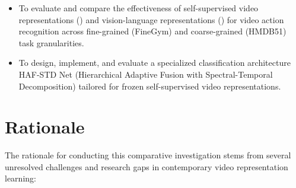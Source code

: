 \begin{itemize}
    \item To evaluate and compare the effectiveness of self-supervised video representations (\vjepaa{}) and vision-language representations (\qwenvl{}) for video action recognition across fine-grained (FineGym) and coarse-grained (HMDB51) task granularities.
    \item To design, implement, and evaluate a specialized classification architecture HAF-STD Net (Hierarchical Adaptive Fusion with Spectral-Temporal Decomposition) tailored for frozen self-supervised video representations.
\end{itemize}

\section{Rationale}

The rationale for conducting this comparative investigation stems from several unresolved challenges and research gaps in contemporary video representation learning:

